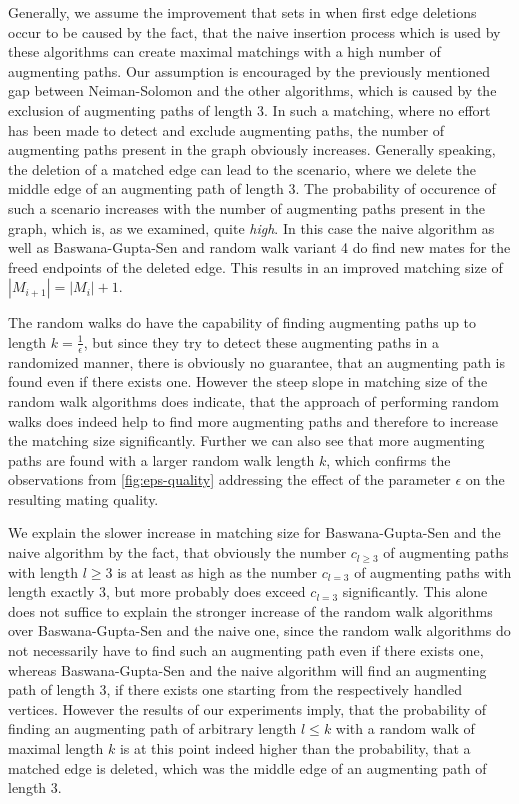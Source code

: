 \documentclass{article}      %
\begin{document}
Generally, we assume the improvement that sets in when first edge deletions occur to be caused by the fact, that the naive insertion process which is used by these algorithms can create maximal matchings with a high number of augmenting paths. Our assumption is encouraged by the previously mentioned gap between Neiman-Solomon and the other algorithms, which is caused by the exclusion of augmenting paths of length $3$. In such a matching, where no effort has been made to detect and exclude augmenting paths, the number of augmenting paths present in the graph obviously increases. Generally speaking, the deletion of a matched edge can lead to the scenario, where we delete the middle edge of an augmenting path of length $3$. The probability of occurence of such a scenario increases with the number of augmenting paths present in the graph, which is, as we examined, quite \emph{high}. In this case the naive algorithm as well as Baswana-Gupta-Sen and random walk variant 4 do find new mates for the freed endpoints of the deleted edge. This results in an improved matching size of $|M_{i+1}|=|M_i|+1$.

The random walks do have the capability of finding augmenting paths up to length $k=\frac{1}{\epsilon}$, but since they try to detect these augmenting paths in a randomized manner, there is obviously no guarantee, that an augmenting path is found even if there exists one. However the steep slope in matching size of the random walk algorithms does indicate, that the approach of performing random walks does indeed help to find more augmenting paths and therefore to increase the matching size significantly. Further we can also see that more augmenting paths are found with a larger random walk length $k$, which confirms the observations from \ref{fig:eps-quality} addressing the effect of the parameter $\epsilon$ on the resulting mating quality.

We explain the slower increase in matching size for Baswana-Gupta-Sen and the naive algorithm by the fact, that obviously the number $c_{l\geq3}$ of augmenting paths with length $l \geq 3$ is at least as high as the number $c_{l=3}$ of augmenting paths with length exactly $3$, but more probably does exceed $c_{l=3}$ significantly. This alone does not suffice to explain the stronger increase of the random walk algorithms over Baswana-Gupta-Sen and the naive one, since the random walk algorithms do not necessarily have to find such an augmenting path even if there exists one, whereas Baswana-Gupta-Sen and the naive algorithm will find an augmenting path of length 3, if there exists one starting from the respectively handled vertices. However the results of our experiments imply, that the probability of finding an augmenting path of arbitrary length $l \leq k$ with a random walk of maximal length $k$ is at this point indeed higher than the probability, that a matched edge is deleted, which was the middle edge of an augmenting path of length $3$.
\end{document}
